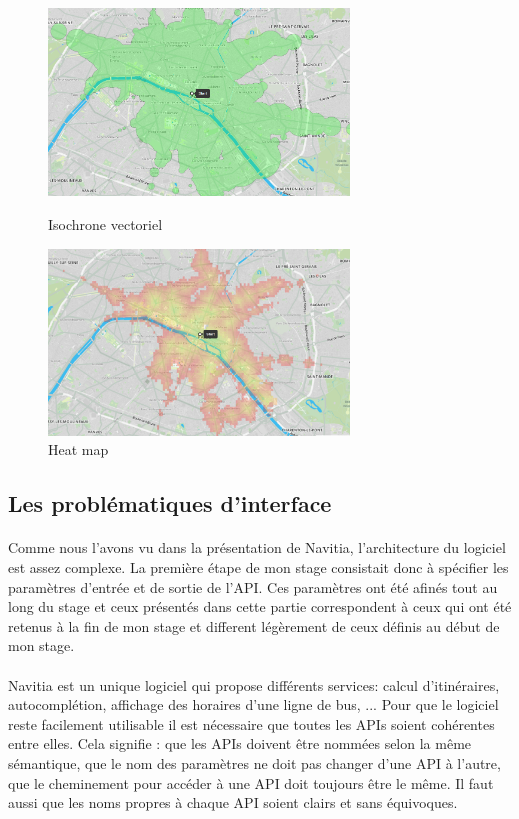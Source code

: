 \documentclass[a4paper]{report}
\begin{document}
\begin{figure}[H]
	\begin{minipage}[c]{.46\linewidth}
		\includegraphics[width=8cm]{image/iso_vect}
       		\caption{Isochrone vectoriel}
		\label{Isochrone vectoriel}
	\end{minipage} \hfill
	\begin{minipage}[c]{.46\linewidth}
		\includegraphics[width=8cm]{image/heat_map}
       		\caption{Heat map}
		\label{Heat map}
	\end{minipage}
\end{figure}

\subsection{Les problématiques d'interface}

\paragraph{} Comme nous l'avons vu dans la présentation de Navitia, l'architecture du logiciel est assez complexe. La première étape de mon stage consistait donc à spécifier les paramètres d'entrée et de sortie de l'API. Ces paramètres ont été afinés tout au long du stage et ceux présentés dans cette partie correspondent à ceux qui ont été retenus à la fin de mon stage et different légèrement de ceux définis au début de mon stage. 

\paragraph{} Navitia est un unique logiciel qui propose différents services: calcul d'itinéraires, autocomplétion, affichage des horaires d'une ligne de bus, ... Pour que le logiciel reste facilement utilisable il est nécessaire que toutes les APIs soient cohérentes entre elles. Cela signifie : que les APIs doivent être nommées selon la même sémantique, que le nom des paramètres ne doit pas changer d'une API à l'autre, que le cheminement pour accéder à une API doit toujours être le même. Il faut aussi que les noms propres à chaque API soient clairs et sans équivoques. 
\end{document}

